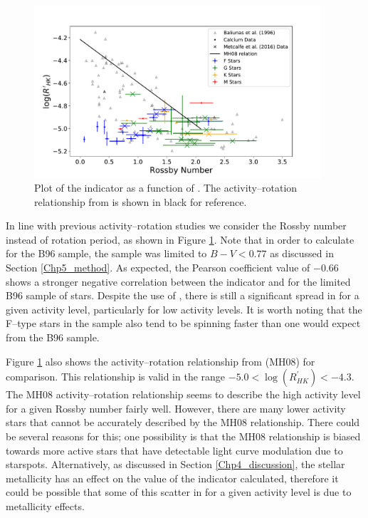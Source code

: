 \begin{figure}
    \centering
    \includegraphics[width=0.95\textwidth]{Figures/5-Activity_rotation/rhk_v_r0.pdf}
    \caption[\Rprime indicator as a function of \Ro]{Plot of the \Rprime indicator as a function of \Ro. The activity--rotation relationship from \citet{Mamajek_Hillenbrand_2008} is shown in black for reference.}
    \label{fig:rhk_v_ro}
\end{figure}

In line with previous activity--rotation studies \citep{Mamajek_Hillenbrand_2008,Metcalfe_etal_2016} we consider the Rossby number instead of rotation period, as shown in Figure \ref{fig:rhk_v_ro}. Note that in order to calculate \Ro for the B96 sample, the sample was limited to $B-V < 0.77$ as discussed in Section \ref{Chp5_method}. As expected, the Pearson coefficient value of $-0.66$ shows a stronger negative correlation between the \Rprime indicator and \Ro for the limited B96 sample of stars. Despite the use of \Ro, there is still a significant spread in \Ro for a given activity level, particularly for low activity levels. It is worth noting that the F--type stars in the sample also tend to be spinning faster than one would expect from the B96 sample.

Figure \ref{fig:rhk_v_ro} also shows the activity--rotation relationship from \citet{Mamajek_Hillenbrand_2008} (MH08) for comparison. This relationship is valid in the range $-5.0 < \log(R^{'}_{HK}) < -4.3$. The MH08 activity--rotation relationship seems to describe the high activity level for a given Rossby number fairly well. However, there are many lower activity stars that cannot be accurately described by the MH08 relationship. There could be several reasons for this; one possibility is that the MH08 relationship is biased towards more active stars that have detectable light curve modulation due to starspots. Alternatively, as discussed in Section \ref{Chp4_discussion}, the stellar metallicity has an effect on the value of the \Rprime indicator calculated, therefore it could be possible that some of this scatter in \Ro for a given activity level is due to metallicity effects.


